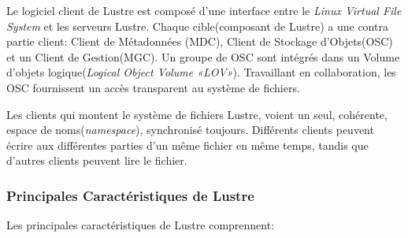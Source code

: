 \documentclass[12pt]{article}
\begin{document}
\begin{description}
Le logiciel client de Lustre est composé d'une interface entre le \textit{Linux Virtual File System} et les serveurs Lustre. Chaque cible(composant de Lustre) a une contra partie client: Client de Métadonnées (MDC), Client de Stockage d'Objets(OSC) et un Client de Gestion(MGC). Un groupe de OSC sont intégrés dans un Volume d'objets logique(\textit{Logical Object Volume «LOV»}). Travaillant en collaboration, les OSC fournissent un accès transparent au système de fichiers.

Les clients qui montent le système de fichiers Lustre, voient un seul, cohérente, espace de noms(\textit{namespace}), synchronisé toujours. Différents clients peuvent écrire aux différentes parties d'un même fichier en même temps, tandis que d'autres clients peuvent lire le fichier.
\end{description}
\subsubsection{Principales Caractéristiques de Lustre}

Les principales caractéristiques de Lustre comprennent: \\
\end{document}
